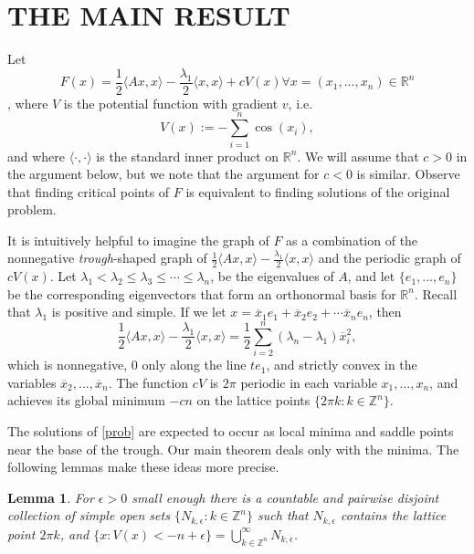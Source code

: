 \documentclass[twoside]{article}
\newtheorem{lemma}[theorem]{Lemma}
\newcommand{\R}{{\mathbb R}}
\newcommand{\Z}{{\mathbb Z}}
\begin{document}
\section{THE MAIN RESULT}

\setcounter{subsubsection}{0}

Let \[F(x)=\frac{1}{2} \langle Ax,x \rangle-\frac{\lambda_1}{2}\langle x,x\rangle+cV(x)\forall x=(x_1,...,x_n)\in\R^n\] , where $V$ is the potential function with gradient $v$, i.e.
 \[
 V(x):=-\sum_{i=1}^n\cos(x_i),
 \]and where $\langle \cdot,\cdot \rangle$ is the standard inner product on $\R^n$. We will assume that $c>0$ in the argument below, but we note that the argument for $c<0$ is similar. Observe that finding critical points of $F$ is equivalent to finding solutions of the original problem.

 It is intuitively helpful to imagine the graph of $F$ as a combination of the nonnegative {\em trough}-shaped graph of $\frac{1}{2} \langle Ax,x \rangle-\frac{\lambda_1}{2}\langle x,x\rangle$ and the periodic graph of $cV(x)$. Let $\lambda_1<\lambda_2\leq \lambda_3\leq\cdots\leq\lambda_n$, be the eigenvalues of $A$, and let $\{e_1,...,e_n\}$ be the corresponding eigenvectors that form an orthonormal basis for $\R^n$. Recall that $\lambda_1$ is positive and simple. If we let $x=\overline{x}_1e_1+\overline{x}_2e_2+\cdots \overline{x}_ne_n$, then
 \[
 \frac{1}{2} \langle Ax,x \rangle-\frac{\lambda_1}{2}\langle x,x\rangle=\frac{1}{2}\sum_{i=2}^n(\lambda_n-\lambda_1)\overline{x}_i^2,
 \]
 which is nonnegative, $0$ only along the line $te_1$, and strictly convex in the variables $\overline{x}_2,...,\overline{x}_n$. The function $cV$ is $2\pi$ periodic in each variable $x_1,...,x_n$, and achieves its global minimum $-cn$ on the lattice points $\{2\pi k:k\in\Z^n\}$.

The solutions of \eqref{prob} are expected to occur as local minima and saddle points near the base of the trough. Our main theorem deals only with the minima. The following lemmas make these ideas more precise.

\begin{lemma}
For $\epsilon>0$ small enough there is a countable and pairwise disjoint collection of simple open sets $\{N_{k,\epsilon}:k\in\Z^n\}$ such that $N_{k,\epsilon}$ contains the lattice point $2\pi k$, and $\{x:V(x)<-n+\epsilon\}=\bigcup_{k\in\Z^n}^{\infty}N_{k,\epsilon}$.
\label{L1}
\end{lemma}
\end{document}
